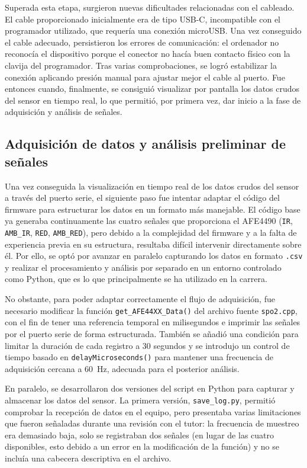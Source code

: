 Superada esta etapa, surgieron nuevas dificultades relacionadas con el cableado. El cable proporcionado inicialmente era de tipo USB-C, incompatible con el programador utilizado, que requería una conexión microUSB. Una vez conseguido el cable adecuado, persistieron los errores de comunicación: el ordenador no reconocía el dispositivo porque el conector no hacía buen contacto físico con la clavija del programador. Tras varias comprobaciones, se logró estabilizar la conexión aplicando presión manual para ajustar mejor el cable al puerto. Fue entonces cuando, finalmente, se consiguió visualizar por pantalla los datos crudos del sensor en tiempo real, lo que permitió, por primera vez, dar inicio a la fase de adquisición y análisis de señales. 

\subsection{Adquisición de datos y análisis preliminar de señales}

Una vez conseguida la visualización en tiempo real de los datos crudos del sensor a través del puerto serie, el siguiente paso fue intentar adaptar el código del firmware para estructurar los datos en un formato más manejable. El código base ya generaba continuamente las cuatro señales que proporciona el AFE4490 (\texttt{IR}, \texttt{AMB\_IR}, \texttt{RED}, \texttt{AMB\_RED}), pero debido a la complejidad del firmware y a la falta de experiencia previa en su estructura, resultaba difícil intervenir directamente sobre él. Por ello, se optó por avanzar en paralelo capturando los datos en formato \texttt{.csv} y realizar el procesamiento y análisis por separado en un entorno controlado como Python, que es lo que principalmente se ha utilizado en la carrera. 

No obstante, para poder adaptar correctamente el flujo de adquisición, fue necesario modificar la función \texttt{get\_AFE44XX\_Data()} del archivo fuente \texttt{spo2.cpp}, con el fin de tener una referencia temporal en milisegundos e imprimir las señales por el puerto serie de forma estructurada. También se añadió una condición para limitar la duración de cada registro a 30 segundos y se introdujo un control de tiempo basado en \texttt{delayMicroseconds()} para mantener una frecuencia de adquisición cercana a 60~Hz, adecuada para el posterior análisis.

En paralelo, se desarrollaron dos versiones del script en Python para capturar y almacenar los datos del sensor. La primera versión, \texttt{save\_log.py}, permitió comprobar la recepción de datos en el equipo, pero presentaba varias limitaciones que fueron señaladas durante una revisión con el tutor: la frecuencia de muestreo era demasiado baja, solo se registraban dos señales (en lugar de las cuatro disponibles, esto debido a un error en la modificación de la función) y no se incluía una cabecera descriptiva en el archivo.

